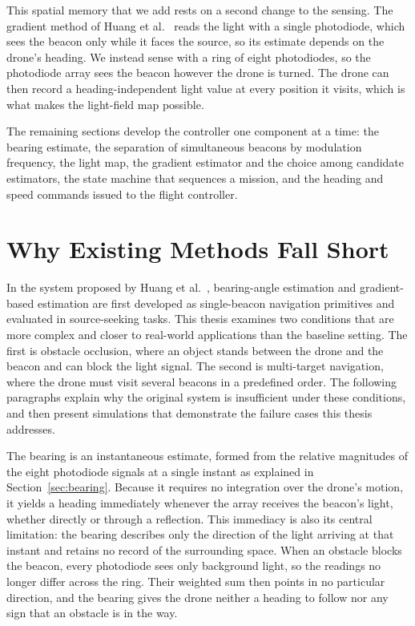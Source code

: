 This spatial memory that we add rests on a second change to the sensing. The gradient method of Huang et al.~\cite{huang2026lta} reads the light with a single photodiode, which sees the beacon only while it faces the source, so its estimate depends on the drone's heading. We instead sense with a ring of eight photodiodes, so the photodiode array sees the beacon however the drone is turned. The drone can then record a heading-independent light value at every position it visits, which is what makes the light-field map possible.

The remaining sections develop the controller one component at a time: the bearing estimate, the separation of simultaneous beacons by modulation frequency, the light map, the gradient estimator and the choice among candidate estimators, the state machine that sequences a mission, and the heading and speed commands issued to the flight controller.


\section{Why Existing Methods Fall Short}
\label{sec:existing-methods-fall-short}
In the system proposed by Huang et al.~\cite{huang2026lta}, bearing-angle estimation and gradient-based estimation are first developed as single-beacon navigation primitives and evaluated in source-seeking tasks. This thesis examines two conditions that are more complex and closer to real-world applications than the baseline setting. The first is obstacle occlusion, where an object stands between the drone and the beacon and can block the light signal. The second is multi-target navigation, where the drone must visit several beacons in a predefined order. The following paragraphs explain why the original system is insufficient under these conditions, and then present simulations that demonstrate the failure cases this thesis addresses.


The bearing is an instantaneous estimate, formed from the relative magnitudes of the eight photodiode signals at a single instant as explained in Section~\ref{sec:bearing}. Because it requires no integration over the drone's motion, it yields a heading immediately whenever the array receives the beacon's light, whether directly or through a reflection. This immediacy is also its central limitation: the bearing describes only the direction of the light arriving at that instant and retains no record of the surrounding space. When an obstacle blocks the beacon, every photodiode sees only background light, so the readings no longer differ across the ring. Their weighted sum then points in no particular direction, and the bearing gives the drone neither a heading to follow nor any sign that an obstacle is in the way.

